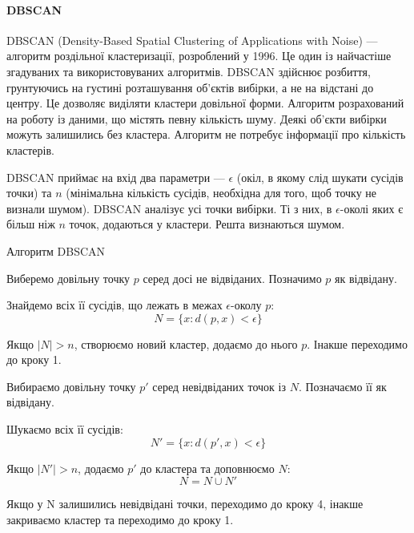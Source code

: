         \paragraph {DBSCAN}
        
            DBSCAN (Density-Based Spatial Clustering of Applications with Noise) \cite{DBSCAN} --- алгоритм роздільної кластеризації, розроблений у 1996. Це один із найчастіше згадуваних та використовуваних алгоритмів. DBSCAN здійснює розбиття, грунтуючись на густині розташування об'єктів вибірки, а не на відстані до центру. Це дозволяє виділяти кластери довільної форми. Алгоритм розрахований на роботу із даними, що містять певну кількість шуму. Деякі об'єкти вибірки можуть залишились без кластера. Алгоритм не потребує інформації про кількість кластерів.
            
            DBSCAN приймає на вхід два параметри --- $\epsilon$ (окіл, в якому слід шукати сусідів точки) та $n$ (мінімальна кількість сусідів, необхідна для того, щоб точку не визнали шумом). DBSCAN аналізує усі точки вибірки. Ті з них, в $\epsilon$-околі яких є більш ніж $n$ точок, додаються у кластери. Решта визнаються шумом.
            
            \begin{algorithm}
                \caption{Алгоритм DBSCAN}
                \enumerate
                    \item Виберемо довільну точку $p$ серед досі не відвіданих. Позначимо $p$ як відвідану.
                    \item Знайдемо всіх її сусідів, що лежать в межах $\epsilon$-околу $p$:
                        \begin{equation}
                            N = \{x : d(p, x) < \epsilon\}
                        \end{equation}
                    \item Якщо $\mid N \mid > n$, створюємо новий кластер, додаємо до нього $p$. Інакше переходимо до кроку 1.
                    \item Вибираємо довільну точку $p'$ серед невідвіданих точок із $N$. Позначаємо її як відвідану.
                    \item Шукаємо всіх її сусідів:
                        \begin{equation}
                            N' = \{x : d(p', x) < \epsilon\}
                        \end{equation}
                    \item Якщо $\mid N' \mid > n$, додаємо $p'$ до кластера та доповнюємо $N$:
                        \begin{equation}
                            N = N \cup N'
                        \end{equation}
                    \item Якщо у N залишились невідвідані точки, переходимо до кроку 4, інакше закриваємо кластер та переходимо до кроку 1.
            \end{algorithm}
            
